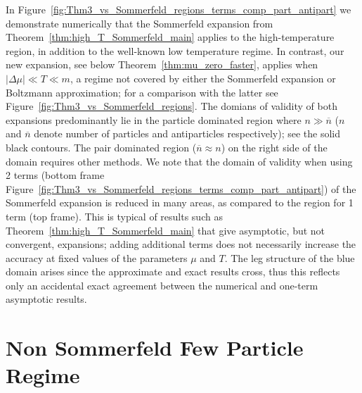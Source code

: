\documentclass[sn-mathphys,Numbered]{sn-jnl}
\newcommand{\rf}[1]{Figure~{\ref{#1}}}
\newcommand{\rTh}[1]{Theorem~{\ref{#1}}}
\begin{document}
In  \rf{fig:Thm3_vs_Sommerfeld_regions_terms_comp_part_antipart} we demonstrate numerically that the Sommerfeld expansion from \rTh{thm:high_T_Sommerfeld_main} applies to the high-temperature region, in addition to the well-known low temperature regime.  In contrast, our new expansion, see below \rTh{thm:mu_zero_faster}, applies when $|\Delta\mu|\ll T\ll m$, a regime not covered by either the Sommerfeld expansion or Boltzmann approximation; for a comparison with the latter see   \rf{fig:Thm3_vs_Sommerfeld_regions}. The domians of validity of both expansions  predominantly lie in the particle dominated region where $n\gg \overline{n}$ ($n$ and $\overline{n}$ denote number of particles and antiparticles respectively); see the solid black contours. The pair dominated region ($\overline{n}\approx n$) on the right side of the domain requires other methods. We note that the domain of validity when using 2 terms (bottom frame \rf{fig:Thm3_vs_Sommerfeld_regions_terms_comp_part_antipart}) of the Sommerfeld expansion is reduced in many areas, as compared to the region for 1 term (top frame). This is typical of results such as \rTh{thm:high_T_Sommerfeld_main} that give asymptotic, but not convergent, expansions; adding additional terms does not necessarily increase the accuracy at fixed values of the parameters $\mu$ and $T$. The leg structure of the blue domain arises since the approximate and exact results cross, thus this reflects only an accidental exact agreement between the numerical  and one-term asymptotic results. 









\section{Non Sommerfeld Few Particle Regime}\label{sec:beyondSommer}
\end{document}
